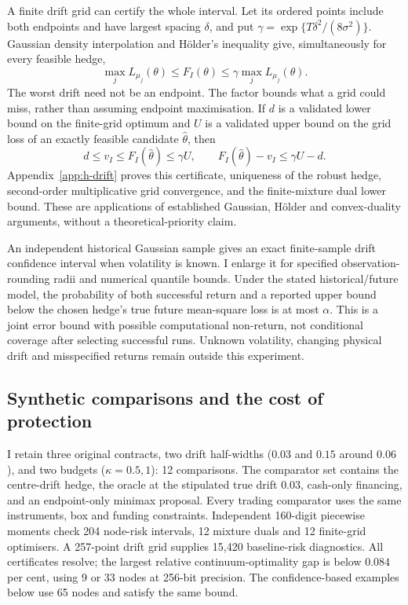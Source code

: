 \documentclass[11pt]{article}
\begin{document}
A finite drift grid can certify the whole interval. Let its ordered points
include both endpoints and have largest spacing $\delta$, and put
$\gamma=\exp\{T\delta^2/(8\sigma^2)\}$. Gaussian density interpolation and
H\"older's inequality give, simultaneously for every feasible hedge,
\begin{equation}
 \max_jL_{\mu_j}(\theta)\leq F_I(\theta)
 \leq\gamma\max_jL_{\mu_j}(\theta).
 \label{eq:h-drift-grid-envelope}
\end{equation}
The worst drift need not be an endpoint. The factor bounds what a grid
could miss, rather than assuming endpoint maximisation. If $d$ is a
validated lower bound on the finite-grid optimum and $U$ is a validated
upper bound on the grid loss of an exactly feasible candidate $\widehat\theta$,
then
\begin{equation}
 d\leq v_I\leq F_I(\widehat\theta)\leq\gamma U,
 \qquad F_I(\widehat\theta)-v_I\leq\gamma U-d.
 \label{eq:h-drift-robust-bracket}
\end{equation}
Appendix~\ref{app:h-drift} proves this certificate, uniqueness of the robust
hedge, second-order multiplicative grid convergence, and the finite-mixture
dual lower bound. These are applications of established Gaussian,
H\"older and convex-duality arguments, without a theoretical-priority claim.

An independent historical Gaussian sample gives an exact finite-sample
drift confidence interval when volatility is known. I enlarge it for
specified observation-rounding radii and numerical quantile bounds.
Under the stated historical/future model, the probability of both
successful return and a reported upper bound below the chosen hedge's
true future mean-square loss is at most $\alpha$. This is a joint error bound with possible computational
non-return, not conditional coverage after selecting successful runs.
Unknown volatility, changing physical drift and misspecified returns remain
outside this experiment.


\subsection{Synthetic comparisons and the cost of protection}

I retain three original contracts, two drift half-widths ($0.03$ and
$0.15$ around $0.06$), and two budgets ($\kappa=0.5,1$): 12 comparisons.
The comparator set contains the centre-drift hedge, the oracle at the
stipulated true drift $0.03$, cash-only financing, and an endpoint-only
minimax proposal. Every trading comparator uses the same instruments,
box and funding constraints. Independent 160-digit piecewise moments check
204 node-risk intervals, 12 mixture duals and 12 finite-grid optimisers.
A 257-point drift grid supplies 15,420 baseline-risk diagnostics.
All certificates resolve; the largest relative continuum-optimality gap
is below $0.084$ per cent, using 9 or 33 nodes at 256-bit precision.
The confidence-based examples below use 65 nodes and satisfy the same bound.
\end{document}
